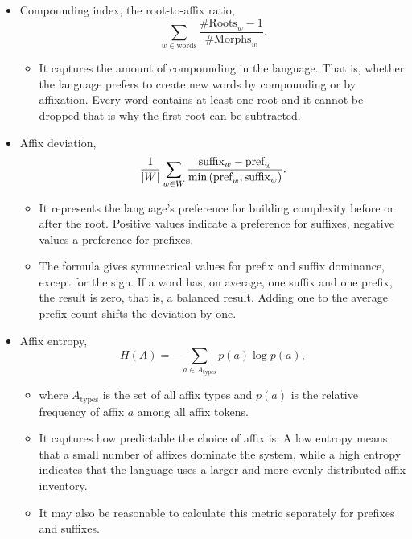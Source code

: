 \begin{itemize}
    \item Compounding index, the root-to-affix ratio,
    $$\sum_{w\in\text{words}}\frac{\text{\# Roots}_w-1}{\text{\# Morphs}_w}.$$
    \begin{itemize}
        \item It captures the amount of compounding in the language. That is, whether the language prefers to create new words by compounding or by affixation. Every word contains at least one root and it cannot be dropped that is why the first root can be subtracted.
    \end{itemize}
    \item Affix deviation,
    $$\frac{1}{\left|{W}\right|}\sum_{w\in W}\frac{\text{suffix}_w-\text{pref}_w}{\min{(\text{pref}_w,\text{suffix}_w)}}.$$
    \begin{itemize}
        \item It represents the language's preference for building complexity before or after the root. Positive values indicate a preference for suffixes, negative values a preference for prefixes.
        \item The formula gives symmetrical values for prefix and suffix dominance, except for the sign. If a word has, on average, one suffix and one prefix, the result is zero, that is, a balanced result. Adding one to the average prefix count shifts the deviation by one.
    \end{itemize}
    \item Affix entropy,
    $$
    H(A)=-\sum_{a\in A_{\text{types}}}p(a)\log p(a),
    $$
    \begin{itemize}
        \item where $A_{\text{types}}$ is the set of all affix types and $p(a)$ is the relative frequency of affix $a$ among all affix tokens.
        \item It captures how predictable the choice of affix is. A low entropy means that a small number of affixes dominate the system, while a high entropy indicates that the language uses a larger and more evenly distributed affix inventory.
        \item It may also be reasonable to calculate this metric separately for prefixes and suffixes.
    \end{itemize}
\end{itemize}
